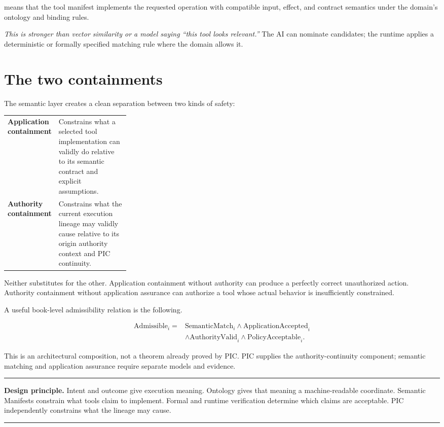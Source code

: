 \documentclass[10pt,oneside,openany]{book}
\newcommand{\principle}[1]{%
  \vspace{4pt}
  \noindent\begin{minipage}{\linewidth}
  \hrule\vspace{5pt}
  \small\sffamily\raggedright\textbf{Design principle.} #1
  \vspace{5pt}\hrule
  \end{minipage}\vspace{4pt}
}
\begin{document}
means that the tool manifest implements the requested operation with compatible input, effect, and contract semantics under the domain's ontology and binding rules.

\emph{This is stronger than vector similarity or a model saying ``this tool looks relevant.''} The AI can nominate candidates; the runtime applies a deterministic or formally specified matching rule where the domain allows it.

\section{The two containments}
The semantic layer creates a clean separation between two kinds of safety:

\begin{center}
\begin{tabularx}{0.94\linewidth}{>{\bfseries}p{0.28\linewidth} X}
\toprule
Application containment & Constrains what a selected tool implementation can validly do relative to its semantic contract and explicit assumptions. \\
Authority containment & Constrains what the current execution lineage may validly cause relative to its origin authority context and PIC continuity. \\
\bottomrule
\end{tabularx}
\end{center}

Neither substitutes for the other. Application containment without authority can produce a perfectly correct unauthorized action. Authority containment without application assurance can authorize a tool whose actual behavior is insufficiently constrained.

A useful book-level admissibility relation is the following.
\begin{formulabox}
\[
\begin{aligned}
\mathrm{Admissible}_i={}&\mathrm{SemanticMatch}_i
\land \mathrm{ApplicationAccepted}_i\\
&\land \mathrm{AuthorityValid}_i
\land \mathrm{PolicyAcceptable}_i.
\end{aligned}
\]
\end{formulabox}
This is an architectural composition, not a theorem already proved by PIC. PIC supplies the authority-continuity component; semantic matching and application assurance require separate models and evidence.

\principle{Intent and outcome give execution meaning. Ontology gives that meaning a machine-readable coordinate. Semantic Manifests constrain what tools claim to implement. Formal and runtime verification determine which claims are acceptable. PIC independently constrains what the lineage may cause.}
\end{document}
